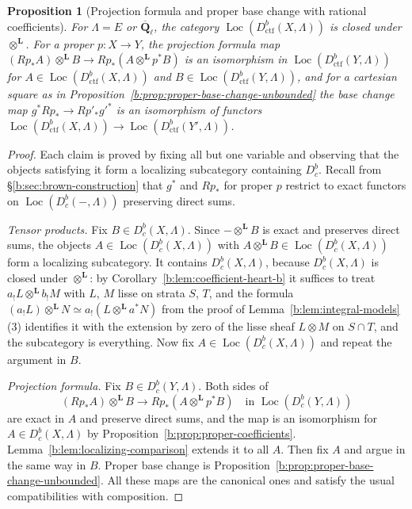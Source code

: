 \documentclass[11pt,a4paper]{article}
\numberwithin{equation}{section}
\newtheorem{proposition}[theorem]{Proposition}
\theoremstyle{definition}
\theoremstyle{remark}
\newcommand{\Dbc}{D^b_c}
\newcommand{\Loc}{\operatorname{Loc}}
\newcommand{\Qbar}{\overline{\mathbf Q}_\ell}
\newcommand{\Dctf}{D^b_{\mathrm{ctf}}}
\begin{document}
\begin{proposition}[Projection formula and proper base change with rational coefficients]
\label{b:prop:pf-bc-generated}
For $\Lambda=E$ or $\Qbar$, the category $\Loc(\Dctf(X,\Lambda))$ is closed
under $\otimes^{\mathbf L}$. For a proper $p:X\to Y$, the projection
formula map $(Rp_*A)\otimes^{\mathbf L}B\to Rp_*(A\otimes^{\mathbf L}p^*B)$
is an isomorphism in $\Loc(\Dctf(Y,\Lambda))$ for
$A\in\Loc(\Dctf(X,\Lambda))$ and $B\in\Loc(\Dctf(Y,\Lambda))$, and for a
cartesian square as in Proposition~\ref{b:prop:proper-base-change-unbounded}
the base change map $g^*Rp_*\to Rp'_*g'^*$ is an isomorphism of
functors $\Loc(\Dctf(X,\Lambda))\to\Loc(\Dctf(Y',\Lambda))$.
\end{proposition}
\begin{proof}
Each claim is proved by fixing all but one variable and observing that
the objects satisfying it form a localizing subcategory containing
$\Dbc$. Recall from \S\ref{b:sec:brown-construction} that $g^*$ and
$Rp_*$ for proper $p$ restrict to exact functors on
$\Loc(\Dbc(-,\Lambda))$ preserving direct sums.

\emph{Tensor products.} Fix $B\in\Dbc(X,\Lambda)$. Since
$-\otimes^{\mathbf L}B$ is exact and preserves direct sums, the objects
$A\in\Loc(\Dbc(X,\Lambda))$ with $A\otimes^{\mathbf L}B\in\Loc(\Dbc(X,\Lambda))$
form a localizing subcategory. It contains $\Dbc(X,\Lambda)$, because
$\Dbc(X,\Lambda)$ is closed under $\otimes^{\mathbf L}$: by
Corollary~\ref{b:lem:coefficient-heart-b} it suffices to treat
$a_!L\otimes^{\mathbf L}b_!M$ with $L$, $M$ lisse on strata $S$, $T$,
and the formula
$(a_!L)\otimes^{\mathbf L}N\simeq a_!(L\otimes^{\mathbf L}a^*N)$ from the
proof of Lemma~\ref{b:lem:integral-models}(3) identifies it with the
extension by zero of the lisse sheaf $L\otimes M$ on $S\cap T$, and the
subcategory is everything. Now fix $A\in\Loc(\Dbc(X,\Lambda))$ and repeat the
argument in $B$.

\emph{Projection formula.} Fix $B\in\Dbc(Y,\Lambda)$. Both sides of
\[
 (Rp_*A)\otimes^{\mathbf L}B\longrightarrow
                    Rp_*(A\otimes^{\mathbf L}p^*B)
 \quad\text{in }\Loc(\Dbc(Y,\Lambda))
\]
are exact in $A$ and preserve direct sums, and the map is an isomorphism
for $A\in\Dbc(X,\Lambda)$ by Proposition~\ref{b:prop:proper-coefficients}.
Lemma~\ref{b:lem:localizing-comparison} extends it to all $A$. Then fix
$A$ and argue in the same way in $B$. Proper base change is
Proposition~\ref{b:prop:proper-base-change-unbounded}. All these maps
are the canonical ones and satisfy the usual compatibilities with
composition.
\end{proof}
\end{document}

